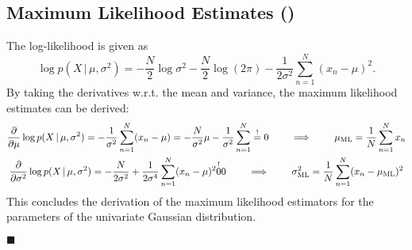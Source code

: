 \documentclass[11pt, a4paper]{scrartcl}
\newcommand{\given}{\,\vert\,}
\newcommand{\eot}{\hfill\(\blacksquare\)}
\newcommand{\diffstar}{\texorpdfstring{\raisebox{-1pt}{\resizebox{!}{8pt}{\(\star\)}}}{*}}
\newcommand{\onestar}  {(\diffstar)}
\begin{document}
		\subsection{Maximum Likelihood Estimates  \onestar}
			The log-likelihood is given as
			\begin{equation}
				\log p(X \given \mu, \sigma^2) = -\frac{N}{2} \log \sigma^2 - \frac{N}{2} \log(2\pi) - \frac{1}{2 \sigma^2} \sum_{n = 1}^{N} (x_n - \mu)^2.
			\end{equation}
			By taking the derivatives w.r.t. the mean and variance, the maximum likelihood estimates can be derived:
			\begin{gather}
				\pdv{\mu} \log p(X \given \mu, \sigma^2)
					= -\frac{1}{\sigma^2} \sum_{n = 1}^{N} (x_n - \mu)
					= -\frac{N}{\sigma^2} \mu - \frac{1}{\sigma^2} \sum_{n = 1}^{N}
					\overset{!}{=} 0
				\qquad\implies\qquad
				\mu_\mathrm{ML} = \frac{1}{N} \sum_{n = 1}^{N} x_n \\
				\pdv{\sigma^2} \log p(X \given \mu, \sigma^2)
					= -\frac{N}{2 \sigma^2} + \frac{1}{2 \sigma^4} \sum_{n = 1}^{N} (x_n - \mu)^2
					\overset{!}{0} 0
				\qquad\implies\qquad
				\sigma^2_\mathrm{ML} = \frac{1}{N} \sum_{n = 1}^{N} (x_n - \mu_\mathrm{ML})^2
			\end{gather}
			This concludes the derivation of the maximum likelihood estimators for the parameters of the univariate Gaussian distribution.

			\eot
\end{document}
